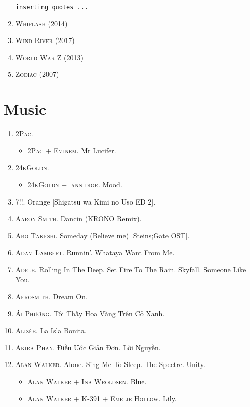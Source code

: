 \documentclass{article}
\numberwithin{equation}{section}
\begin{document}
\begin{enumerate}
	\texttt{inserting quotes ...}
	\item \textsc{Whiplash} (2014)
	\item \textsc{Wind River} (2017)
	\item \textsc{World War Z} (2013)
	\item \textsc{Zodiac} (2007)
\end{enumerate}


\section{Music}

\begin{enumerate}
	\item \textsc{2Pac.}
	\begin{itemize}
		\item \textsc{2Pac $+$ Eminem.} Mr Lucifer.
	\end{itemize}
	\item \textsc{24kGoldn.}
	\begin{itemize}
		\item \textsc{24kGoldn $+$ iann dior.} Mood.
	\end{itemize}
	\item \textsc{7!!.} Orange [Shigatsu wa Kimi no Uso ED 2].
	\item \textsc{Aaron Smith.} Dancin (KRONO Remix).
	\item \textsc{Abo Takeshi.} Someday (Believe me) [Steins;Gate OST].
	\item \textsc{Adam Lambert.} Runnin'. Whataya Want From Me.
	\item \textsc{Adele.} Rolling In The Deep. Set Fire To The Rain. Skyfall. Someone Like You.
	\item \textsc{Aerosmith.} Dream On.
	\item \textsc{Ái Phương.} Tôi Thấy Hoa Vàng Trên Cỏ Xanh.
	\item \textsc{Alizée.} La Isla Bonita.
	\item \textsc{Akira Phan.} Điều Ước Giản Đơn. Lời Nguyền.
	\item \textsc{Alan Walker.} Alone. Sing Me To Sleep. The Spectre. Unity.
	\begin{itemize}
		\item \textsc{Alan Walker $+$ Ina Wroldsen.} Blue.
		\item \textsc{Alan Walker $+$ K-391 $+$ Emelie Hollow.} Lily.

\end{itemize}
\end{enumerate}
\end{document}
